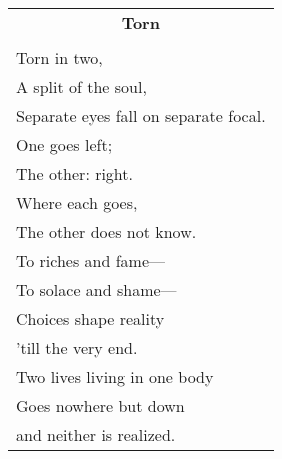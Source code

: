 \documentclass{article}
\begin{document}
\newcommand{\h}{\hspace*{4ex}}

\begin{center}
\begin{tabular}{l}
\multicolumn{1}{c}{\large\textbf{Torn}} \\
\\
Torn in two, \\
A split of the soul, \\
Separate eyes fall on separate focal. \\
One goes left; \\
The other:  right. \\
Where each goes, \\
The other does not know. \\
To riches and fame--- \\
To solace and shame--- \\
Choices shape reality \\
'till the very end. \\
Two lives living in one body \\
Goes nowhere but down \\
and neither is realized. \\
\end{tabular}
\end{center}
\end{document}
